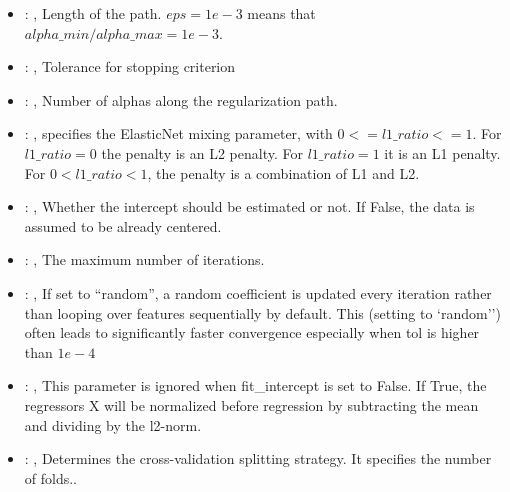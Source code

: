 \begin{itemize}
    \item {}: , 
      Length of the path. $eps=1e-3$ means that $alpha\_min / alpha\_max = 1e-3$.

    \item {}: , 
      Tolerance for stopping criterion

    \item {}: , 
      Number of alphas along the regularization path.

    \item {}: , 
      specifies the                                                  ElasticNet mixing parameter,
      with $0 <= l1\_ratio <= 1$.                                                  For $l1\_ratio =
      0$ the penalty is an L2 penalty.                                                  For
      $l1\_ratio = 1$ it is an L1 penalty.                                                  For $0 <
      l1\_ratio < 1$, the penalty is a combination of L1 and L2.

    \item {}: , 
      Whether the intercept should be estimated or not. If False,
      the data is assumed to be already centered.

    \item {}: , 
      The maximum number of iterations.

    \item {}: , 
      If set to ``random'', a random coefficient is updated every iteration
      rather than looping over features sequentially by default. This (setting to `random'')
      often leads to significantly faster convergence especially when tol is higher than $1e-4$

    \item {}: , 
      This parameter is ignored when fit\_intercept is set to False. If True,
      the regressors X will be normalized before regression by subtracting the mean and
      dividing by the l2-norm.

    \item {}: , 
      Determines the cross-validation splitting strategy.
      It specifies the number of folds..
  \end{itemize}


